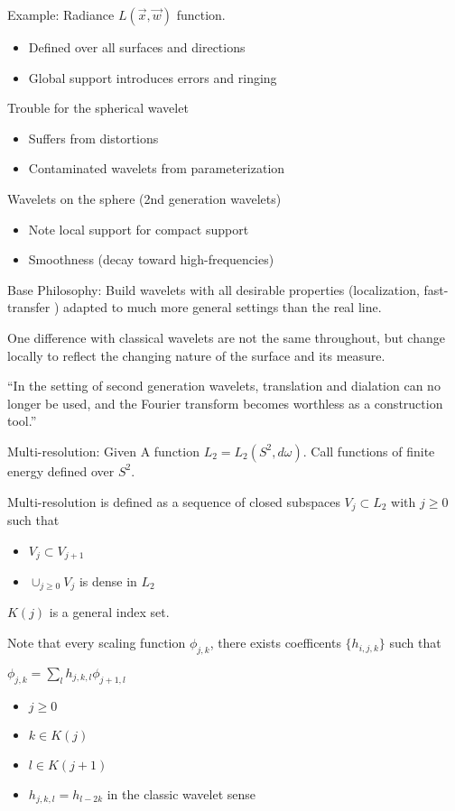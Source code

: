 \documentclass[11pt]{article}
\begin{document}
Example: Radiance $L(\vec{x}, \vec{w})$ function.
\begin{itemize}
\item Defined over all surfaces and directions
\item Global support introduces errors and ringing
\end{itemize}

Trouble for the spherical wavelet
\begin{itemize}
\item Suffers from distortions
\item Contaminated wavelets from parameterization 
\end{itemize}

Wavelets on the sphere (2nd generation wavelets)
\begin{itemize}
\item Note local support for compact support
\item Smoothness (decay toward high-frequencies)
\end{itemize}

Base Philosophy:  
Build wavelets with all desirable properties (localization, fast-transfer ) adapted to much more general settings than the real line.

One difference with classical wavelets are not the same throughout, but change locally to reflect the changing nature of the surface and its measure.

``In the setting of second generation wavelets, translation and dialation can no longer be used, and the Fourier transform becomes worthless as a construction tool.''

Multi-resolution:  Given A function $L_2 = L_2 (S^2, d\omega)$.  Call functions of finite energy defined over $S^2$.  

Multi-resolution is defined as a sequence of closed subspaces $V_j \subset L_2$ with $j\ge 0$ such that 
\begin{itemize}
\item $V_j \subset V_{j+1}$
\item $\cup_{j\ge0} V_j $ is dense in $L_2$
\end{itemize}

$K (j)$ is a general index set.

Note that every scaling function $\phi_{j,k}$, there exists coefficents $\{h_{i,j,k}\}$ such that

$\phi_{j,k} = \sum\limits_l h_{j,k,l} \phi_{j+1,l}$
\begin{itemize}
\item $j \ge 0 $
\item $k \in K(j)$
\item $l \in K(j+1) $
\item $h_{j,k,l} = h_{l-2k}$ in the classic wavelet sense
\end{itemize}
\end{document}
